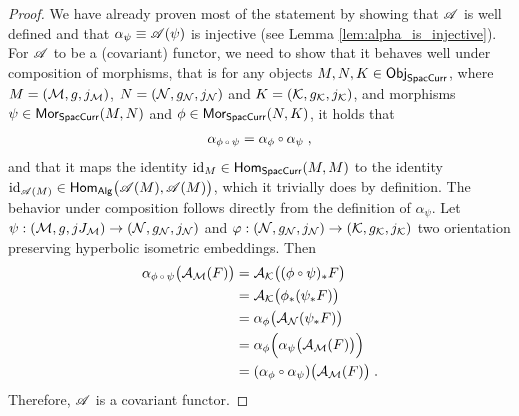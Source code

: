 \begin{proof}
We have already proven most of the statement by showing that $\AA$ is well defined and that $\alpha_\psi \equiv \AA(\psi)$ is injective (see Lemma \ref{lem:alpha_is_injective}).\\
%
%
%
For $\AA$ to be a (covariant) functor, we need to show that it behaves well under composition of morphisms, that is for any objects $M,N,K \in \mathsf{Obj}_\SpacCurr$, where $M=(\M,g,j_\M)$, $N=(\N,g_\N,j_\N)$ and $K=(\K,g_\K,j_\K)$, and morphisms $\psi \in \textsf{Mor}_\SpacCurr(M,N)$ and $\phi \in \textsf{Mor}_\SpacCurr(N,K)$, it holds that
\begin{align}
\alpha_{\phi \,\comp\, \psi} = \alpha_\phi \comp \alpha_\psi \formspace,
\end{align}
and that it maps the identity $\text{id}_M \in \mathsf{Hom}_\SpacCurr(M,M)$ to the identity $\text{id}_{\AA(M)} \in  \mathsf{Hom}_\Alg\big(\mathscr{A}(M),\mathscr{A}(M)\big)$, which it trivially does by definition.
The behavior under composition follows directly from the definition of $\alpha_\psi$. Let $\psi : (\M,g,jJ_\M) \to (\N, g_\N ,j_\N)$ and $\varphi : (\N, g_\N ,j_\N) \to (\mathcal{K}, g_\K, j_\mathcal{K})$ two orientation preserving hyperbolic isometric embeddings. Then
\begin{align}
\alpha_{\phi\, \comp \, \psi} \big( \A_\M(F) \big)
&= \A_\mathcal{K} \big( (\phi \comp \psi )_* F \big) \notag \\
&= \A_\mathcal{K} \big(\phi_*(\psi_* F) \big) \notag\\
&= \alpha_\phi \big(\A_\N(\psi_* F) \big) \notag\\
&= \alpha_\phi \Big( \alpha_\psi \big(\A_\M (F) \big) \Big) \notag\\
&= (\alpha_\phi \comp \alpha_\psi)\big( \A_\M (F) \big)  \formspace.
\end{align}
Therefore, $\AA$ is a covariant functor.
\end{proof}
%
%
%
%
%
%
%
%
%
%
